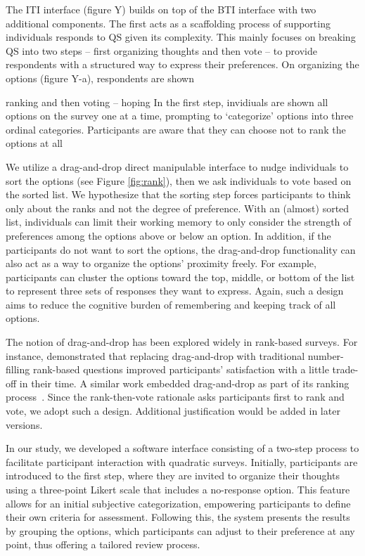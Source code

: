 The ITI interface (figure Y) builds on top of the BTI interface with two additional components. The first acts as a scaffolding process of supporting individuals responds to QS given its complexity. This mainly focuses on breaking QS into two steps -- first organizing thoughts and then vote -- to provide respondents with a structured way to express their preferences. On organizing the options (figure Y-a), respondents are shown 


ranking and then voting -- hoping  In the first step, invidiuals are shown all options on the survey one at a time, prompting to `categorize' options into three ordinal categories. Participants are aware that they can choose not to rank the options at all

We utilize a drag-and-drop direct manipulable interface to nudge individuals to sort the options (see Figure \ref{fig:rank}), then we ask individuals to vote based on the sorted list. We hypothesize that the sorting step forces participants to think only about the ranks and not the degree of preference. With an (almost) sorted list, individuals can limit their working memory to only consider the strength of preferences among the options above or below an option. In addition, if the participants do not want to sort the options, the drag-and-drop functionality can also act as a way to organize the options' proximity freely. For example, participants can cluster the options toward the top, middle, or bottom of the list to represent three sets of responses they want to express. Again, such a design aims to reduce the cognitive burden of remembering and keeping track of all options. 

The notion of drag-and-drop has been explored widely in rank-based surveys. For instance, \textcite{krosnick2018measurement} demonstrated that replacing drag-and-drop with traditional number-filling rank-based questions improved participants' satisfaction with a little trade-off in their time. A similar work embedded drag-and-drop as part of its ranking process~\cite{timbrook2013comparison}. Since the rank-then-vote rationale asks participants first to rank and vote, we adopt such a design. Additional justification would be added in later versions.



In our study, we developed a software interface consisting of a two-step process to facilitate participant interaction with quadratic surveys. Initially, participants are introduced to the first step, where they are invited to organize their thoughts using a three-point Likert scale that includes a no-response option. This feature allows for an initial subjective categorization, empowering participants to define their own criteria for assessment. Following this, the system presents the results by grouping the options, which participants can adjust to their preference at any point, thus offering a tailored review process.

